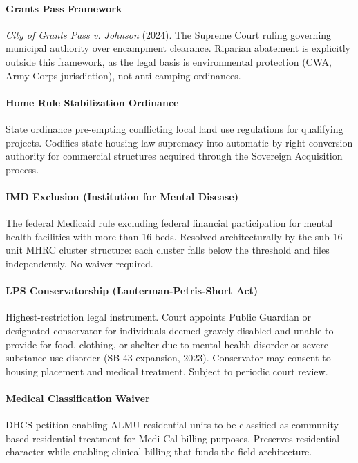 {\paragraph{Grants Pass Framework} \textit{City of Grants Pass v. Johnson} (2024). The Supreme Court ruling governing municipal authority over encampment clearance. Riparian abatement is explicitly outside this framework, as the legal basis is environmental protection (CWA, Army Corps jurisdiction), not anti-camping ordinances.

\paragraph{Home Rule Stabilization Ordinance} State ordinance pre-empting conflicting local land use regulations for qualifying projects. Codifies state housing law supremacy into automatic by-right conversion authority for commercial structures acquired through the Sovereign Acquisition process.

\paragraph{IMD Exclusion (Institution for Mental Disease)} The federal Medicaid rule excluding federal financial participation for mental health facilities with more than 16 beds. Resolved architecturally by the sub-16-unit MHRC cluster structure: each cluster falls below the threshold and files independently. No waiver required.

\paragraph{LPS Conservatorship (Lanterman-Petris-Short Act)} Highest-restriction legal instrument. Court appoints Public Guardian or designated conservator for individuals deemed gravely disabled and unable to provide for food, clothing, or shelter due to mental health disorder or severe substance use disorder (SB 43 expansion, 2023). Conservator may consent to housing placement and medical treatment. Subject to periodic court review.

\paragraph{Medical Classification Waiver} DHCS petition enabling ALMU residential units to be classified as community-based residential treatment for Medi-Cal billing purposes. Preserves residential character while enabling clinical billing that funds the field architecture.

}
